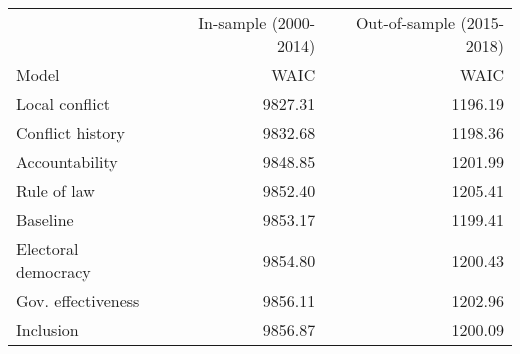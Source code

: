\begin{longtable}{lrr}
\toprule
 & In-sample (2000-2014) & Out-of-sample (2015-2018) \\ 
\cmidrule(lr){2-2} \cmidrule(lr){3-3}
Model & WAIC & WAIC \\ 
\midrule\addlinespace[2.5pt]
Local conflict & 9827.31 & 1196.19 \\ 
Conflict history & 9832.68 & 1198.36 \\ 
Accountability & 9848.85 & 1201.99 \\ 
Rule of law & 9852.40 & 1205.41 \\ 
Baseline & 9853.17 & 1199.41 \\ 
Electoral democracy & 9854.80 & 1200.43 \\ 
Gov. effectiveness & 9856.11 & 1202.96 \\ 
Inclusion & 9856.87 & 1200.09 \\ 
\bottomrule
\end{longtable}

